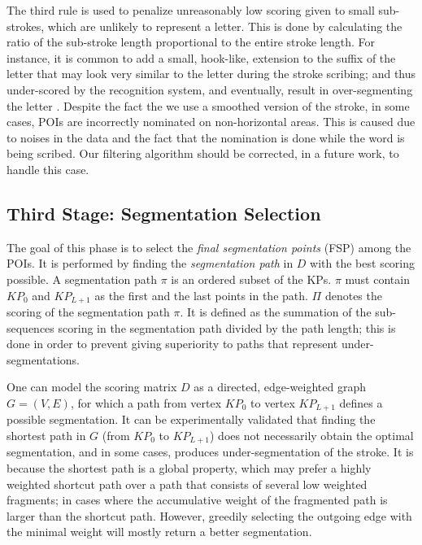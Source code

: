 \documentclass[10pt, conference, compsocconf]{IEEEtran}
\begin{document}
The third rule is used to penalize unreasonably low scoring given to small sub-strokes, which are unlikely to represent a letter. 
This is done by calculating the ratio of the sub-stroke length proportional to the entire stroke length.
For instance, it is common to add a small, hook-like, extension to the suffix of the letter  that may look very similar to the letter  during the stroke scribing; and thus under-scored by the recognition system, and eventually, result in over-segmenting the letter . 
Despite the fact the we use a smoothed version of the stroke, in some cases, POIs are incorrectly nominated on non-horizontal areas. 
This is caused due to noises in the data and the fact that the nomination is done while the word is being scribed. 
Our filtering algorithm should be corrected, in a future work, to handle this case.

\subsection{Third Stage: Segmentation Selection}
The goal of this phase is to select the \emph{final segmentation points} (FSP) among the POIs. 
It is performed by finding the \emph{segmentation path} in $D$ with the best scoring possible. 
A segmentation path $\pi$ is an ordered subset of the KPs. $\pi$ must contain $KP_{0}$ and $KP_{L+1}$ as the first and the last points in the path.
$\Pi$ denotes the scoring of the segmentation path $\pi$. 
It is defined as the summation of the sub-sequences scoring in the segmentation path divided by the path length; this is done in order to prevent giving superiority to paths that represent under-segmentations.

One can model the scoring matrix $D$ as a directed, edge-weighted graph $G=(V,E)$, for which a path from vertex $KP_0$ to vertex $KP_{L+1}$ defines a possible segmentation. 
It can be experimentally validated that finding the shortest path in $G$ (from $KP_0$ to $KP_{L+1}$) does not necessarily obtain the optimal segmentation, and in some cases, produces under-segmentation of the stroke. 
It is because the shortest path is a global property, which may prefer a highly weighted shortcut path over a path that consists of several low weighted fragments; in cases where the accumulative weight of the fragmented path is larger than the shortcut path.
However, greedily selecting the outgoing edge with the minimal weight will mostly return a better segmentation.
\end{document}
